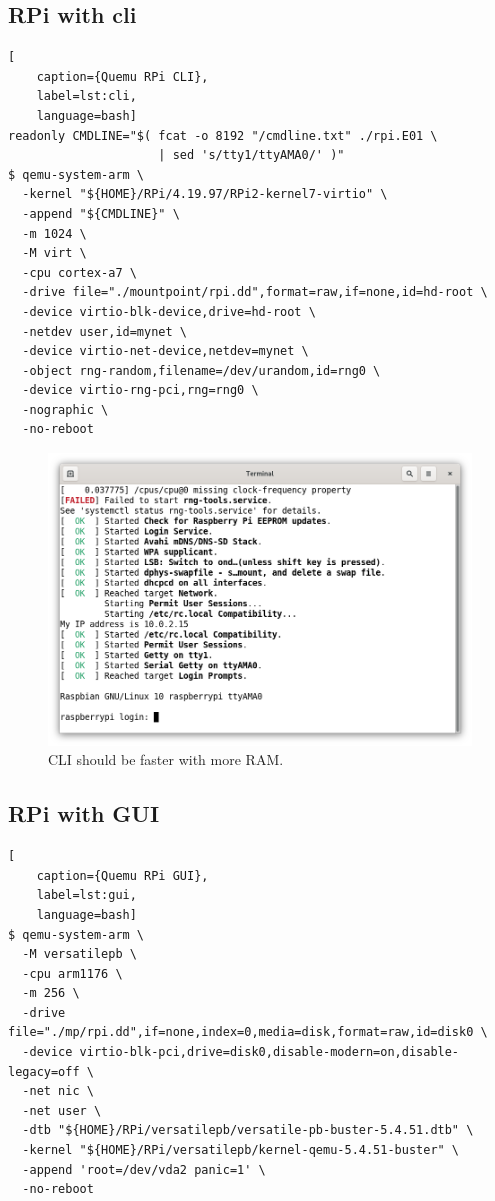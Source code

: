 \subsection{RPi with cli}

\begin{lstlisting}[
    caption={Quemu RPi CLI},
    label=lst:cli,
    language=bash]
readonly CMDLINE="$( fcat -o 8192 "/cmdline.txt" ./rpi.E01 \
                     | sed 's/tty1/ttyAMA0/' )"
$ qemu-system-arm \
  -kernel "${HOME}/RPi/4.19.97/RPi2-kernel7-virtio" \
  -append "${CMDLINE}" \
  -m 1024 \
  -M virt \
  -cpu cortex-a7 \
  -drive file="./mountpoint/rpi.dd",format=raw,if=none,id=hd-root \
  -device virtio-blk-device,drive=hd-root \
  -netdev user,id=mynet \
  -device virtio-net-device,netdev=mynet \
  -object rng-random,filename=/dev/urandom,id=rng0 \
  -device virtio-rng-pci,rng=rng0 \
  -nographic \
  -no-reboot
\end{lstlisting}

\begin{figure}[htbp]  %
  \centering
  \includegraphics[width=.5\textwidth]{figures/boot-rpi-with-cli-only.png}
  \caption[Qemu RPi CLI]{CLI should be faster with more RAM.}
  \label{fig:cli}
\end{figure}

\subsection{RPi with GUI}

\begin{lstlisting}[
    caption={Quemu RPi GUI},
    label=lst:gui,
    language=bash]
$ qemu-system-arm \
  -M versatilepb \
  -cpu arm1176 \
  -m 256 \
  -drive file="./mp/rpi.dd",if=none,index=0,media=disk,format=raw,id=disk0 \
  -device virtio-blk-pci,drive=disk0,disable-modern=on,disable-legacy=off \
  -net nic \
  -net user \
  -dtb "${HOME}/RPi/versatilepb/versatile-pb-buster-5.4.51.dtb" \
  -kernel "${HOME}/RPi/versatilepb/kernel-qemu-5.4.51-buster" \
  -append 'root=/dev/vda2 panic=1' \
  -no-reboot
\end{lstlisting}

